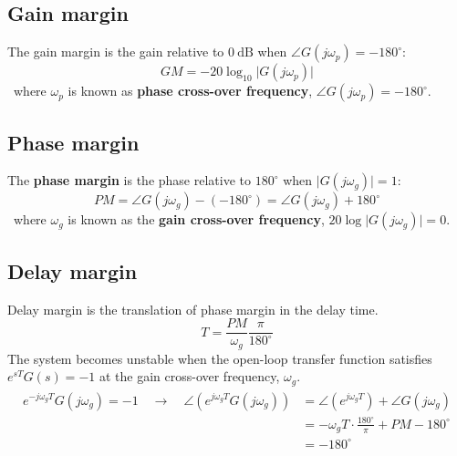 \subsection{Gain margin}
The gain margin is the gain relative to $0 \ \mathrm{dB}$ when $\angle G(j\omega_{p}) = -180^{\circ}$:
 \[ GM = -20\log_{10}\lvert G(j\omega_{p})\rvert\]
 \ where $\omega_{p}$ is known as \textbf{phase cross-over frequency}, $\angle G(j\omega_{p}) = -180^{\circ}$. 

\subsection{Phase margin}
The \textbf{phase margin} is the phase relative to $180^{\circ}$ when $\lvert G(j\omega_{g}) \rvert =1$:
\[ PM = \angle G(j\omega_{g})-(-180^{\circ}) =\angle G(j\omega_{g})+ 180^{\circ}\] 
\ where $\omega_{g}$ is known as the \textbf{gain cross-over frequency}, $20\log \lvert G(j\omega_{g})\rvert = 0$.

\subsection{Delay margin}
Delay margin is the translation of phase margin in the delay time.
\[T = \frac{PM}{\omega_{g}}\frac{\pi}{180^{\circ}}\]
The system becomes unstable when the open-loop transfer function satisfies $e^{sT}G(s) = -1$ at the gain cross-over frequency, $\omega_{g}$.
\begin{align*}
\begin{split}
e^{-j\omega_{g}T}G(j\omega_{g})=-1
\quad \longrightarrow \quad 
 \angle (e^{j\omega_{g}T} G(j\omega_{g}))&= \angle (e^{j\omega_{g}T})+\angle G(j\omega_{g}) \\
&= -\omega_{g}T\cdot \frac{180^{\circ}}{\pi}+PM-180^{\circ} \\
&= -180^{\circ}
\end{split}
\end{align*}

\newpage
